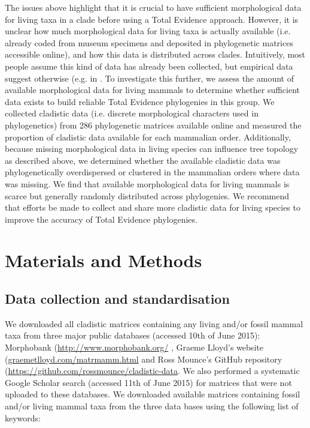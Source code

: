 The issues above highlight that it is crucial to have sufficient morphological data for living taxa in a clade before using a Total Evidence approach.
However, it is unclear how much morphological data for living taxa is actually available (i.e. already coded from museum specimens and deposited in phylogenetic matrices accessible online), and how this data is distributed across clades.
Intuitively, most people assume this kind of data has already been collected, but empirical data suggest otherwise (e.g. in \citep{ronquista2012,slaterphylogenetic2013,beckancient2014}.
To investigate this further, we assess the amount of available morphological data for living mammals to determine whether sufficient data exists to build reliable Total Evidence phylogenies in this group.
We collected cladistic data (i.e. discrete morphological characters used in phylogenetics) from 286 phylogenetic matrices available online and measured the proportion of cladistic data available for each mammalian order.
Additionally, because missing morphological data in living species can influence tree topology as described above, %
we determined whether the available cladistic data was phylogenetically overdispersed or clustered in the mammalian orders where data was missing. 
We find that available morphological data for living mammals is scarce but generally randomly distributed across phylogenies. 
We recommend that efforts be made to collect and share more cladistic data for living species to improve the accuracy of Total Evidence phylogenies.

%
%
\section{Materials and Methods}
\subsection{Data collection and standardisation}
We downloaded all cladistic matrices containing any living and/or fossil mammal taxa from three major public databases (accessed 10th of June 2015): Morphobank (\url{http://www.morphobank.org/} \citep{morphobank}, Graeme Lloyd's website (\url{graemetlloyd.com/matrmamm.html} and Ross Mounce's GitHub repository (\url{https://github.com/rossmounce/cladistic-data}.
We also performed a systematic Google Scholar search (accessed 11th of June 2015) for matrices that were not uploaded to these databases. We downloaded available matrices containing fossil and/or living mammal taxa from the three data bases using the following list of keywords:

